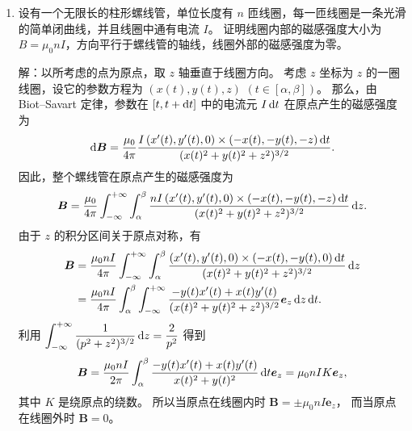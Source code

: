 \begin{enumerate}
\item 设有一个无限长的柱形螺线管，单位长度有 $n$ 匝线圈，每一匝线圈是一条光滑的简单闭曲线，并且线圈中通有电流 $I$。
证明线圈内部的磁感强度大小为 $B=\mu_0 n I$，方向平行于螺线管的轴线，线圈外部的磁感强度为零。

解：以所考虑的点为原点，取 $z$ 轴垂直于线圈方向。
考虑 $z$ 坐标为 $z$ 的一圈线圈，设它的参数方程为 $(x(t), y(t), z)$ $(t \in[\alpha, \beta])$。
那么，由 Biot--Savart 定律，参数在 $[t, t+{\rm d}t]$ 中的电流元 $I \,{\rm d} t$ 在原点产生的磁感强度为
$$\mathrm{d} \boldsymbol{B}=\frac{\mu_{0}}{4\pi} \frac{I\,(x^{\prime}(t), y^{\prime}(t), 0) \times(-x(t),-y(t),-z) \,{\rm d} t}{(x(t)^{2}+y(t)^{2}+z^{2})^{3/2}}.$$
因此，整个螺线管在原点产生的磁感强度为
$$\boldsymbol{B}=\frac{\mu_{0}}{4\pi} \int_{-\infty}^{+\infty} \int_{\alpha}^{\beta} \frac{nI\,(x^{\prime}(t), y^{\prime}(t), 0) \times(-x(t),-y(t),-z) \,{\rm d} t}{(x(t)^{2}+y(t)^{2}+z^{2})^{3/2}} \,{\rm d} z.$$
由于 $z$ 的积分区间关于原点对称，有
\begin{align*}
\boldsymbol{B} & =\frac{\mu_{0}nI}{4\pi} \int_{-\infty}^{+\infty} \int_{\alpha}^{\beta} \frac{(x^{\prime}(t), y^{\prime}(t), 0) \times(-x(t),-y(t), 0) \,{\rm d} t}{(x(t)^{2}+y(t)^{2}+z^{2})^{3/2}} \,{\rm d} z \\
& =\frac{\mu_{0}nI}{4\pi} \int_{\alpha}^{\beta} \int_{-\infty}^{+\infty} \frac{-y(t) x^{\prime}(t)+x(t) y^{\prime}(t)}{(x(t)^{2}+y(t)^{2}+z^{2})^{3/2}} \boldsymbol{e}_{z} \,{\rm d} z \,{\rm d} t.
\end{align*}
利用 $\displaystyle\int_{-\infty}^{+\infty} \frac{1}{(p^{2}+z^{2})^{3/2}} \, {\rm d} z=\frac{2}{p^{2}}$ 得到
$$\boldsymbol{B}=\frac{\mu_{0}nI}{2\pi} \int_{\alpha}^{\beta} \frac{-y(t) x^{\prime}(t)+x(t) y^{\prime}(t)}{x(t)^{2}+y(t)^{2}} \,{\rm d} t \boldsymbol{e}_{z}
=\mu_{0}nIK\boldsymbol{e}_{z},$$
其中 $K$ 是绕原点的绕数。
所以当原点在线圈内时 $\boldsymbol{B}=\pm\mu_{0}nI\boldsymbol{e}_{z}$，
而当原点在线圈外时 $\boldsymbol{B}=0$。
\end{enumerate}

